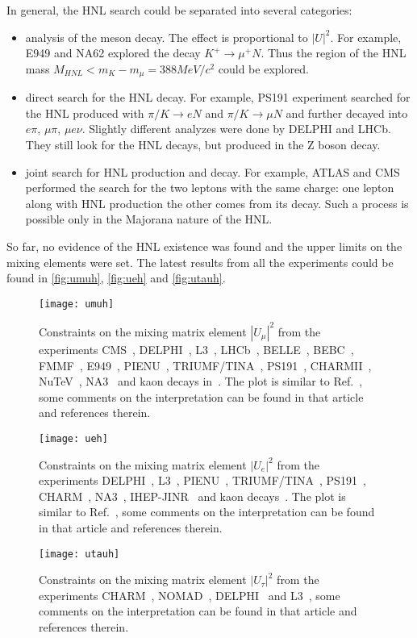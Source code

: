 \documentclass[../main.tex]{subfiles}
\begin{document}
In general, the HNL search could be separated into several categories:
\begin{itemize}
  \item analysis of the meson decay. The effect is proportional to $\left|U\right|^2$. For example, E949 and NA62 explored the decay $K^+\to\mu^+N$. Thus the region of the HNL mass $M_{HNL} < m_K-m_\mu=388 MeV/c^2$ could be explored.
  \item direct search for the HNL decay. For example, PS191 experiment searched for the HNL produced with $\pi/K\to eN$ and $\pi/K\to\mu N$ and further decayed into $e\pi$, $\mu\pi$, $\mu e\nu$. Slightly different analyzes were done by DELPHI and LHCb. They still look for the HNL decays, but produced in the Z boson decay.
  \item joint search for HNL production and decay. For example, ATLAS and CMS performed the search for the two leptons with the same charge: one lepton along with HNL production the other comes from its decay. Such a process is possible only in the Majorana nature of the HNL.
\end{itemize}

So far, no evidence of the HNL existence was found and the upper limits on the mixing elements were set. The latest results from all the experiments could be found in \autoref{fig:umuh}, \autoref{fig:ueh} and \autoref{fig:utauh}.

\begin{figure}[!ht]
\centering
\texttt{[image: umuh]}
\caption{Constraints on the mixing matrix element $|U_{\mu}|^2$ from the experiments CMS~\cite{cms}, DELPHI~\cite{delphi}, L3~\cite{l3}, LHCb~\cite{lhcb}, BELLE~\cite{belle}, BEBC~\cite{bebc}, FMMF~\cite{fmmf}, E949~\cite{e949}, PIENU~\cite{pienu}, TRIUMF/TINA~\cite{triumf}, PS191~\cite{Bernardi1988}, CHARMII~\cite{charm2}, NuTeV~\cite{nutev}, NA3~\cite{na3} and kaon decays in~\cite{kaon1,kaon2}. The plot is similar to Ref.~\cite{drewes}, some comments on the interpretation can be found in that article and references therein.}
\label{fig:umuh}
\end{figure}
\begin{figure}[!ht]
\centering
\texttt{[image: ueh]}
\caption{Constraints on the mixing matrix element $|U_{e}|^2$ from the experiments  DELPHI~\cite{delphi},  L3~\cite{l3}, PIENU~\cite{pienu}, TRIUMF/TINA~\cite{triumf}, PS191~\cite{Bernardi1988}, CHARM~\cite{charm}, NA3~\cite{na3}, IHEP-JINR~\cite{jinr} and kaon decays~\cite{kaon1}. The plot is similar to Ref.~\cite{drewes}, some comments on the interpretation can be found in that article and references therein.}
\label{fig:ueh}
\end{figure}
\begin{figure}[!ht]
\centering
\texttt{[image: utauh]}
\caption{Constraints on the mixing matrix element $|U_{\tau}|^2$ from the experiments  CHARM~\cite{orloff2002limits}, NOMAD~\cite{baldisseris2001search}, DELPHI~\cite{delphi} and L3~\cite{l3}, some comments on the interpretation can be found in that article and references therein.}
\label{fig:utauh}
\end{figure}
\end{document}
